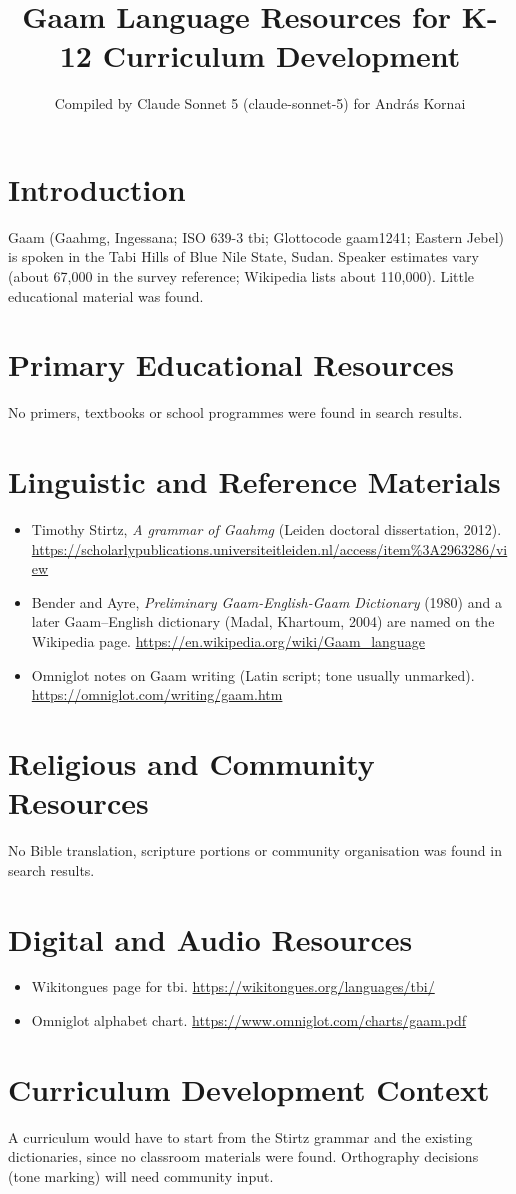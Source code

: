 \documentclass[12pt]{article}
\title{Gaam Language Resources for K-12 Curriculum Development}
\author{Compiled by Claude Sonnet 5 (claude-sonnet-5) for Andr\'as Kornai}
\date{}
\begin{document}
\maketitle
\section{Introduction}
Gaam (Gaahmg, Ingessana; ISO 639-3 tbi; Glottocode gaam1241; Eastern Jebel) is spoken in the Tabi Hills of Blue Nile State, Sudan. Speaker estimates vary (about 67,000 in the survey reference; Wikipedia lists about 110,000). Little educational material was found.
\section{Primary Educational Resources}
No primers, textbooks or school programmes were found in search results.
\section{Linguistic and Reference Materials}
\begin{itemize}
\item Timothy Stirtz, \emph{A grammar of Gaahmg} (Leiden doctoral dissertation, 2012). \url{https://scholarlypublications.universiteitleiden.nl/access/item%3A2963286/view}
\item Bender and Ayre, \emph{Preliminary Gaam-English-Gaam Dictionary} (1980) and a later Gaam--English dictionary (Madal, Khartoum, 2004) are named on the Wikipedia page. \url{https://en.wikipedia.org/wiki/Gaam_language}
\item Omniglot notes on Gaam writing (Latin script; tone usually unmarked). \url{https://omniglot.com/writing/gaam.htm}
\end{itemize}
\section{Religious and Community Resources}
No Bible translation, scripture portions or community organisation was found in search results.
\section{Digital and Audio Resources}
\begin{itemize}
\item Wikitongues page for tbi. \url{https://wikitongues.org/languages/tbi/}
\item Omniglot alphabet chart. \url{https://www.omniglot.com/charts/gaam.pdf}
\end{itemize}
\section{Curriculum Development Context}
A curriculum would have to start from the Stirtz grammar and the existing dictionaries, since no classroom materials were found. Orthography decisions (tone marking) will need community input.
\end{document}
